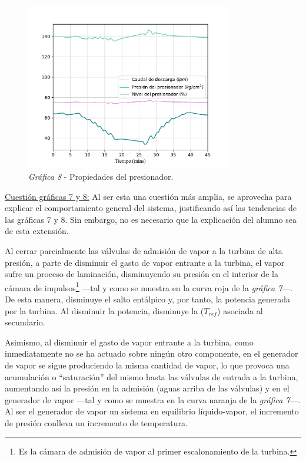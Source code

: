 \begin{figure}[h]
  \centering
  \includegraphics[width=0.8\textwidth]{content/figures/sim1_presionador.pdf}
  \caption{\textit{Gráfica 8} - Propiedades del presionador.}
  \label{fig:sim1_presionador}
\end{figure}

\underline{Cuestión gráficas 7 y 8:} Al ser esta una cuestión más amplia, se aprovecha para explicar el comportamiento general del sistema, justificando así las tendencias de las gráficas 7 y 8. Sin embargo, no es necesario que la explicación del alumno sea de esta extensión.

Al cerrar parcialmente las válvulas de admisión de vapor a la turbina de alta presión, a parte de disminuir el gasto de vapor entrante a la turbina, el vapor sufre un proceso de laminación, disminuyendo su presión en el interior de la cámara de impulsos\footnote{Es la cámara de admisión de vapor al primer escalonamiento de la turbina.} ---tal y como se muestra en la curva roja de la \textit{gráfica 7}---. De esta manera, disminuye el salto entálpico y, por tanto, la potencia generada por la turbina. Al disminuir la potencia, disminuye la ($T_{ref}$) asociada al secundario.

Asimismo, al disminuir el gasto de vapor entrante a la turbina, como inmediatamente no se ha actuado sobre ningún otro componente, en el generador de vapor se sigue produciendo la misma cantidad de vapor, lo que provoca una acumulación o ``saturación'' del mismo hasta las válvulas de entrada a la turbina, aumentando así la presión en la admisión (aguas arriba de las válvulas) y en el generador de vapor ---tal y como se muestra en la curva naranja de la \textit{gráfica 7}---. Al ser el generador de vapor un sistema en equilibrio líquido-vapor, el incremento de presión conlleva un incremento de temperatura.

